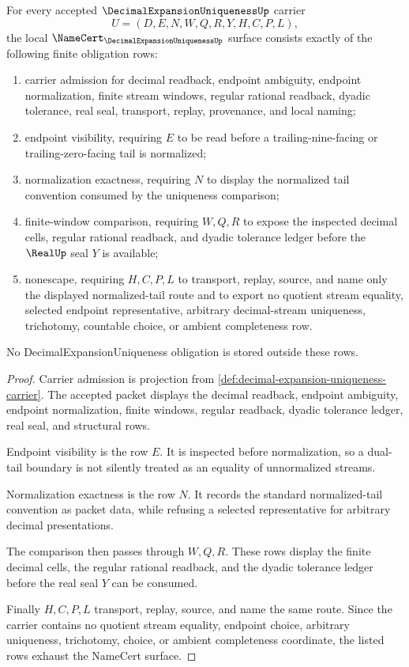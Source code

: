 \begin{theorem}
\label{thm:decimal-expansion-uniqueness-namecert-obligations}
For every accepted $\DecimalExpansionUniquenessUp$ carrier
$$
U=(D,E,N,W,Q,R,Y,H,C,P,L),
$$
the local $\NameCert_{\DecimalExpansionUniquenessUp}$ surface consists exactly of the following finite obligation rows:
\begin{enumerate}
\item carrier admission for decimal readback, endpoint ambiguity, endpoint normalization, finite stream windows, regular rational readback, dyadic tolerance, real seal, transport, replay, provenance, and local naming;
\item endpoint visibility, requiring $E$ to be read before a trailing-nine-facing or trailing-zero-facing tail is normalized;
\item normalization exactness, requiring $N$ to display the normalized tail convention consumed by the uniqueness comparison;
\item finite-window comparison, requiring $W,Q,R$ to expose the inspected decimal cells, regular rational readback, and dyadic tolerance ledger before the $\RealUp$ seal $Y$ is available;
\item nonescape, requiring $H,C,P,L$ to transport, replay, source, and name only the displayed normalized-tail route and to export no quotient stream equality, selected endpoint representative, arbitrary decimal-stream uniqueness, trichotomy, countable choice, or ambient completeness row.
\end{enumerate}
No DecimalExpansionUniqueness obligation is stored outside these rows.
\end{theorem}
\begin{proof}
Carrier admission is projection from \autoref{def:decimal-expansion-uniqueness-carrier}. The accepted packet displays the decimal readback, endpoint ambiguity, endpoint normalization, finite windows, regular readback, dyadic tolerance ledger, real seal, and structural rows.

Endpoint visibility is the row $E$. It is inspected before normalization, so a dual-tail boundary is not silently treated as an equality of unnormalized streams.

Normalization exactness is the row $N$. It records the standard normalized-tail convention as packet data, while refusing a selected representative for arbitrary decimal presentations.

The comparison then passes through $W,Q,R$. These rows display the finite decimal cells, the regular rational readback, and the dyadic tolerance ledger before the real seal $Y$ can be consumed.

Finally $H,C,P,L$ transport, replay, source, and name the same route. Since the carrier contains no quotient stream equality, endpoint choice, arbitrary uniqueness, trichotomy, choice, or ambient completeness coordinate, the listed rows exhaust the NameCert surface.
\end{proof}

